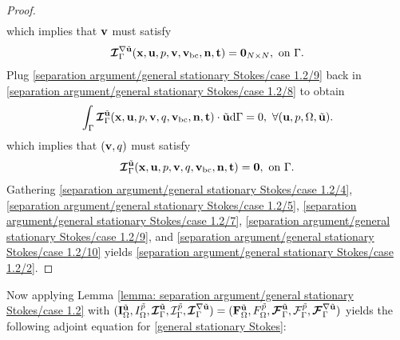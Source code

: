 \documentclass[oneside,11pt]{book}
\numberwithin{equation}{section}
\begin{document}
\begin{enumerate}[leftmargin=0mm]
\begin{itemize}[leftmargin=0in]
\begin{proof}
\begin{align*}
            \end{align*}
            which implies that ${\bf v}$ must satisfy
            \begin{align}
                \label{separation argument/general stationary Stokes/case 1.2/9}
                \boldsymbol{\mathcal{I}}_\Gamma^{\nabla\tilde{\bf u}}({\bf x},{\bf u},p,{\bf v},{\bf v}_{\rm bc},{\bf n},{\bf t}) = {\bf 0}_{N\times N},\mbox{ on }\Gamma.
            \end{align}
            Plug \eqref{separation argument/general stationary Stokes/case 1.2/9} back in \eqref{separation argument/general stationary Stokes/case 1.2/8} to obtain
            \begin{align*}
                \int_\Gamma \boldsymbol{\mathcal{I}}_\Gamma^{\tilde{\bf u}}({\bf x},{\bf u},p,{\bf v},q,{\bf v}_{\rm bc},{\bf n},{\bf t})\cdot\tilde{\bf u}{\rm d}\Gamma = 0,\ \forall({\bf u},p,\Omega,\tilde{\bf u}).
            \end{align*}
            which implies that $({\bf v},q)$ must satisfy
            \begin{align}
                \label{separation argument/general stationary Stokes/case 1.2/10}
                \boldsymbol{\mathcal{I}}_\Gamma^{\tilde{\bf u}}({\bf x},{\bf u},p,{\bf v},q,{\bf v}_{\rm bc},{\bf n},{\bf t}) = {\bf 0},\mbox{ on }\Gamma.
            \end{align}
            Gathering \eqref{separation argument/general stationary Stokes/case 1.2/4}, \eqref{separation argument/general stationary Stokes/case 1.2/5}, \eqref{separation argument/general stationary Stokes/case 1.2/7}, \eqref{separation argument/general stationary Stokes/case 1.2/9}, and \eqref{separation argument/general stationary Stokes/case 1.2/10} yields \eqref{separation argument/general stationary Stokes/case 1.2/2}.
        \end{proof}
        Now applying Lemma \ref{lemma: separation argument/general stationary Stokes/case 1.2} with $({\bf I}_\Omega^{\tilde{\bf u}},I_\Omega^{\tilde{p}},\boldsymbol{\mathcal{I}}_\Gamma^{\tilde{\bf u}},\mathcal{I}_\Gamma^{\tilde{p}},\boldsymbol{\mathcal{I}}_\Gamma^{\nabla\tilde{\bf u}}) = ({\bf F}_\Omega^{\tilde{\bf u}},F_\Omega^{\tilde{p}},\boldsymbol{\mathcal{F}}_\Gamma^{\tilde{\bf u}},\mathcal{F}_\Gamma^{\tilde{p}},\boldsymbol{\mathcal{F}}_\Gamma^{\nabla\tilde{\bf u}})$ yields the following adjoint equation for \eqref{general stationary Stokes}:
        \begin{equation}
            \label{adjoint general stationary Stokes/case 1.2}

\end{equation}
\end{itemize}
\end{enumerate}
\end{document}
